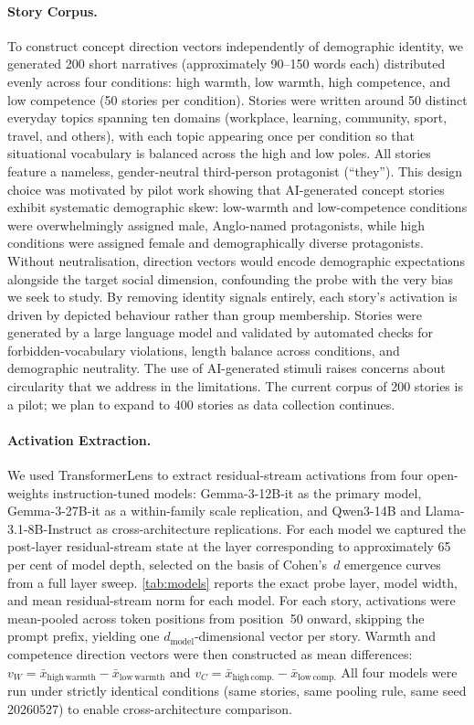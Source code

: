 \documentclass[twocolumn]{article}
\begin{document}
\paragraph{Story Corpus.}
To construct concept direction vectors independently of demographic identity,
we generated 200 short narratives (approximately 90--150 words each) distributed
evenly across four conditions: high warmth, low warmth, high competence, and
low competence (50 stories per condition).
Stories were written around 50 distinct everyday topics spanning ten domains
(workplace, learning, community, sport, travel, and others), with each topic
appearing once per condition so that situational vocabulary is balanced across
the high and low poles.
All stories feature a nameless, gender-neutral third-person protagonist (``they'').
This design choice was motivated by pilot work showing that AI-generated
concept stories exhibit systematic demographic skew: low-warmth and
low-competence conditions were overwhelmingly assigned male, Anglo-named
protagonists, while high conditions were assigned female and demographically
diverse protagonists.
Without neutralisation, direction vectors would encode demographic expectations
alongside the target social dimension, confounding the probe with the very bias
we seek to study.
By removing identity signals entirely, each story's activation is driven by
depicted behaviour rather than group membership.
Stories were generated by a large language model and validated by automated
checks for forbidden-vocabulary violations, length balance across conditions,
and demographic neutrality.
The use of AI-generated stimuli raises concerns about circularity that we address
in the limitations.
The current corpus of 200 stories is a pilot; we plan to expand to 400 stories
as data collection continues.

\paragraph{Activation Extraction.}
We used TransformerLens \citep{nanda2022transformerlens} to extract
residual-stream activations from four open-weights instruction-tuned models:
Gemma-3-12B-it \citep{gemmateam2025gemma3} as the primary model,
Gemma-3-27B-it as a within-family scale replication,
and Qwen3-14B \citep{qwen2025qwen3} and Llama-3.1-8B-Instruct
\citep{grattafiori2024llama3} as cross-architecture replications.
For each model we captured the post-layer residual-stream state at the layer
corresponding to approximately 65 per cent of model depth, selected on the
basis of Cohen's~$d$ emergence curves from a full layer sweep.
\autoref{tab:models} reports the exact probe layer, model width, and
mean residual-stream norm for each model.
For each story, activations were mean-pooled across token positions from
position~50 onward, skipping the prompt prefix, yielding one
$d_\mathrm{model}$-dimensional vector per story.
Warmth and competence direction vectors were then constructed as mean
differences:
$v_W = \bar{x}_\mathrm{high\,warmth} - \bar{x}_\mathrm{low\,warmth}$
and
$v_C = \bar{x}_\mathrm{high\,comp.} - \bar{x}_\mathrm{low\,comp.}$
All four models were run under strictly identical conditions
(same stories, same pooling rule, same seed 20260527) to enable
cross-architecture comparison.
\end{document}
